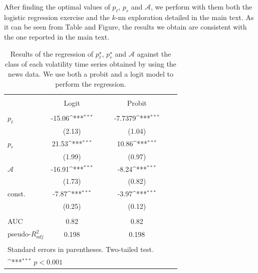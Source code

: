 \documentclass[amsmath,amssymb,aps,pre,floatfix,twocolumn,superscriptaddress]{revtex4}
\begin{document}
After finding the optimal values of $p_{\ell}$, $p_{r}$ and $\mathcal{A}$, we perform with them both the logistic regression exercise and the $k$-nn exploration detailed in the main text. As it can be seen from Table and Figure, the results we obtain are consistent with the one reported in the main text.

\begin{table}
\centering
  \caption{Results of the regression of $p^\star_\ell $, $p^\star_r$ and $ \mathcal{A}$ against the class of each volatility time series obtained by using the news data. We use both a probit and a logit model to perform the regression.} 
  \label{tab: regressions appendix} 
{
\def\sym#1{\ifmmode^{#1}\else\(^{#1}\)\fi}
\begin{tabular}{l*{5}{c}}
\hline\hline\\[-1.8ex] 
            &\multicolumn{1}{c}{Logit} & $\quad$ & \multicolumn{1}{c}{Probit}\\
\hline\\[-2.2ex] 
$p_{\ell}$      &      -15.06\sym{***} & $\quad$ &      -7.7379\sym{***}\\
            &    (2.13)         & $\quad$ &    (1.04)    \\
[1em]            
$p_r$     &     21.53\sym{***} & $\quad$ &     10.86\sym{***} \\
            &   (1.99)         & $\quad$ &   (0.97)       \\
[1em] 

$\mathcal{A}$      &      -16.91\sym{***}  & $\quad$ &      -8.24\sym{***} \\
            &   (1.73)         & $\quad$ &    (0.82)       \\
[1em] 

const.      &      -7.87\sym{***}  & $\quad$ &      -3.97\sym{***} \\
            &   (0.25)         & $\quad$ &    (0.12)       \\
[1em]

\hline\\[-2.2ex] 
AUC      &        0.82         & $\quad$ &        0.82       \\
pseudo-$R^2_{adj}$   &       0.198         & $\quad$ &       0.198    \\
\hline\hline\\[-1.8ex] 
\multicolumn{4}{l}{\footnotesize Standard errors in parentheses. Two-tailed test.}\\
\multicolumn{4}{l}{\footnotesize \sym{***} $p<0.001$}\\
\end{tabular}
}
\end{table}
\end{document}
